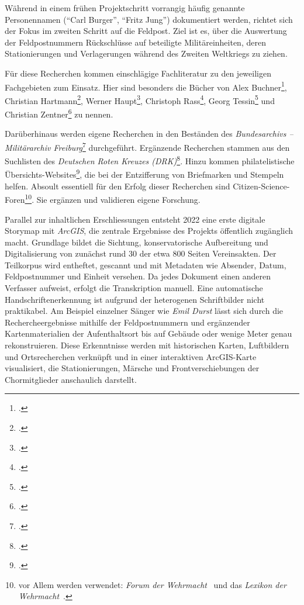 \documentclass[12pt, a4paper, ngerman, bidi=default]{article}
\let\cite\footcite
\begin{document}
Während in einem frühen Projektschritt vorrangig häufig genannte Personennamen (\enquote{Carl Burger}, \enquote{Fritz Jung})
dokumentiert werden, richtet sich der Fokus im zweiten Schritt auf die Feldpost. Ziel ist es, über die Auswertung der Feldpostnummern
Rückschlüsse auf beteiligte Militäreinheiten, deren Stationierungen und Verlagerungen während des Zweiten Weltkriegs zu ziehen.

Für diese Recherchen kommen einschlägige Fachliteratur zu den jeweiligen Fachgebieten zum Einsatz. 
Hier sind besonders die Bücher von Alex Buchner\cite[vgl.][]{buchner_handbuch_1989}, Christian Hartmann\cite[vgl.][]{hartmann_wehrmacht_2010}, 
Werner Haupt\cite[vgl.][]{haupt_buch_1982}, Christoph Rass\cite[vgl.][]{rass_deutsche_2009}, Georg Tessin\cite[vgl.][]{tessin_verbande_1977} 
und Christian Zentner\cite[vgl.][]{zentner_illustrierte_1983} zu nennen.

Darüberhinaus werden eigene Recherchen in den Beständen des \textit{Bundesarchivs – Militärarchiv Freiburg}\cite{hollmann_freiburg_2025} durchgeführt. Ergänzende Recherchen 
stammen aus den Suchlisten des \textit{Deutschen Roten Kreuzes (DRK)}\cite{reuter_drk_2025}. Hinzu kommen philatelistische Übersichts-Websites\cite{noauthor_feldpost_nodate}, 
die bei der Entzifferung von Briefmarken und Stempeln helfen.
Absoult essentiell für den Erfolg dieser Recherchen sind Citizen-Science-Foren\footnote{vor Allem werden verwendet: 
\textit{Forum der Wehrmacht}~\parencite{hermans_forum_nodate} und das \textit{Lexikon der Wehrmacht}~\parencite{altenburger_lexikon_nodate}.}. Sie ergänzen und validieren eigene Forschung.

Parallel zur inhaltlichen Erschliessungen entsteht 2022 eine erste digitale Storymap mit \textit{ArcGIS},
die zentrale Ergebnisse des Projekts öffentlich zugänglich macht. Grundlage bildet die Sichtung, konservatorische Aufbereitung und Digitalisierung
von zunächst rund 30 der etwa 800 Seiten Vereinsakten. Der Teilkorpus wird entheftet, gescannt und mit Metadaten wie Absender, Datum,
Feldpostnummer und Einheit versehen. Da jedes Dokument einen anderen Verfasser aufweist, erfolgt die Transkription manuell. Eine automatische Handschriftenerkennung 
ist aufgrund der heterogenen Schriftbilder nicht praktikabel.
Am Beispiel einzelner Sänger wie \textit{Emil Durst} lässt sich durch die Rechercheergebnisse mithilfe der Feldpostnummern und ergänzender Kartenmaterialien der Aufenthaltsort
bis auf Gebäude oder wenige Meter genau rekonstruieren. Diese Erkenntnisse werden mit historischen Karten, Luftbildern und Ortsrecherchen verknüpft
und in einer interaktiven ArcGIS-Karte visualisiert, die Stationierungen, Märsche und Frontverschiebungen der Chormitglieder anschaulich darstellt. 
\end{document}
